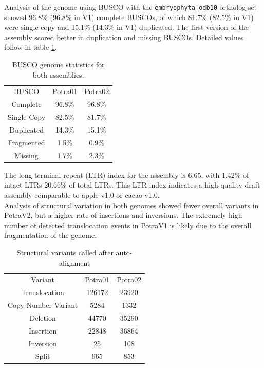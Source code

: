 \documentclass{article}
\begin{document}
Analysis of the genome using BUSCO \citep{simao2015busco} with the \verb|embryophyta_odb10| ortholog set showed 96.8\% (96.8\% in V1) complete BUSCOs, of which 81.7\% (82.5\% in V1) were single copy and 15.1\% (14.3\% in V1) duplicated. The first version of the assembly scored better in duplication and missing BUSCOs. Detailed values follow in table \ref{T2}.\\

\begin{table}
\caption{BUSCO genome statistics for both assemblies.}
\label{T2}
\begin{center}
\begin{tabular}{|c|c|c|}
\hline
BUSCO & Potra01 & Potra02 \\
Complete & 96.8\% & 96.8\% \\
Single Copy & 82.5\% & 81.7\% \\
Duplicated & 14.3\% & 15.1\% \\
Fragmented & 1.5\% & 0.9\% \\
Missing & 1.7\% & 2.3\% \\
\hline
\end{tabular}
\end{center}
\end{table}

The long terminal repeat (LTR) index for the assembly \citep{10.1093/nar/gky730} is 6.65, with 1.42\% of intact LTRs 20.66\% of total LTRs. This LTR index indicates a high-quality draft assembly comparable to apple v1.0 or cacao v1.0.\\
Analysis of structural variation in both genomes showed fewer overall variants in PotraV2, but a higher rate of insertions and inversions. The extremely high number of detected translocation events in PotraV1 is likely due to the overall fragmentation of the genome.\\
\begin{table}
\caption{Structural variants called after auto-alignment}
\label{T4}
\begin{center}
\begin{tabular}{|c|c|c|}
\hline
Variant & Potra01 & Potra02 \\
Translocation & 126172 & 23920 \\
Copy Number Variant & 5284 & 1332 \\
Deletion & 44770 & 35290 \\
Insertion & 22848 & 36864 \\
Inversion & 25 & 108 \\
Split & 965 & 853 \\
\hline
\end{tabular}
\end{center}
\end{table}
\end{document}
